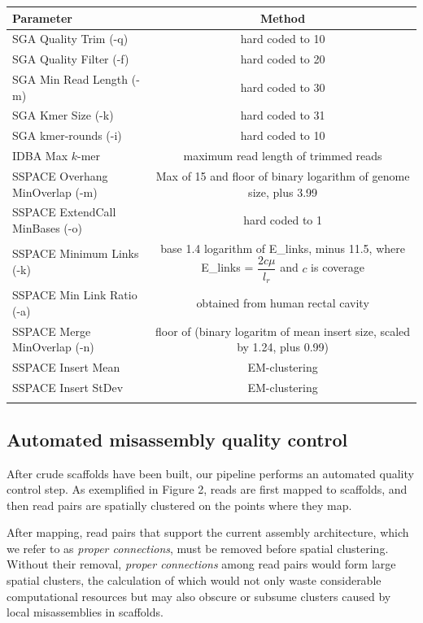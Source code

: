 \documentclass{bioinfo}
\begin{document}
\begin{table}[!t]
{\begin{tabular}{l|c}\toprule
Parameter                       & Method  \\\midrule
SGA Quality Trim (-q)           & hard coded to 10 \\
SGA Quality Filter (-f)         & hard coded to 20  \\
SGA Min Read Length (-m)        & hard coded to 30 \\
SGA Kmer Size (-k)              & hard coded to 31 \\
SGA kmer-rounds (-i)            & hard coded to 10\\
IDBA Max $k$-mer                & maximum read length of trimmed reads \\
SSPACE Overhang MinOverlap (-m) & Max of 15 and floor of binary logarithm of genome size, plus 3.99  \\
SSPACE ExtendCall MinBases (-o) & hard coded to 1 \\
SSPACE Minimum Links (-k)       & base 1.4 logarithm of E\_links, minus 11.5, where E\_links = $\dfrac{2c\mu}{l_r}$ and $c$ is coverage \\
SSPACE Min Link Ratio (-a)      & obtained from human rectal cavity \\
SSPACE Merge MinOverlap (-n)    & floor of (binary logaritm of mean insert size, scaled by 1.24, plus 0.99) \\
SSPACE Insert Mean 	            & EM-clustering \\
SSPACE Insert StDev             & EM-clustering \\
\botrule \\
\end{tabular}}{}
\end{table}

\subsection{Automated misassembly quality control}\label{sec:qc}

After crude scaffolds have been built, our pipeline performs an automated quality control step.
As exemplified in Figure 2, reads are first mapped to scaffolds, and then read pairs are spatially clustered on the
points where they map.

After mapping, read pairs that support the current assembly architecture, which we 
refer to as \emph{proper connections}, must be removed before spatial clustering. Without their removal, \emph{proper connections}
among read pairs would form large spatial clusters, the calculation of which would not only waste considerable 
computational resources but may also obscure or subsume clusters caused by local misassemblies in scaffolds. 
\end{document}
